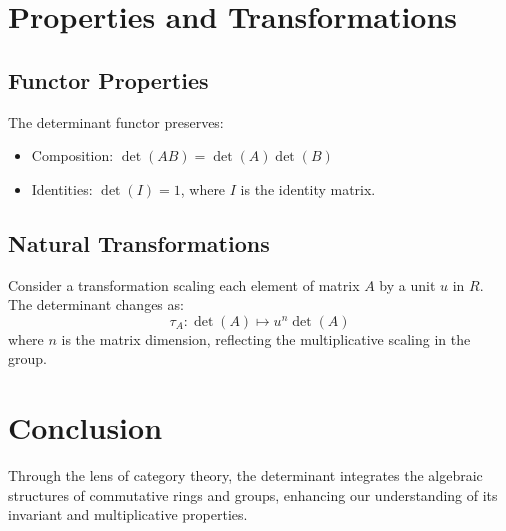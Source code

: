 \section{Properties and Transformations}
\subsection{Functor Properties}
The determinant functor preserves:
\begin{itemize}
	\item Composition: \(\det(AB) = \det(A)\det(B)\)
	\item Identities: \(\det(I) = 1\), where \(I\) is the identity matrix.
\end{itemize}

\subsection{Natural Transformations}
Consider a transformation scaling each element of matrix \(A\) by a unit \(u\) in \(R\). The determinant changes as:
\[ \tau_A: \det(A) \mapsto u^n \det(A) \]
where \(n\) is the matrix dimension, reflecting the multiplicative scaling in the group.

\section{Conclusion}
Through the lens of category theory, the determinant integrates the algebraic structures of commutative rings and groups, enhancing our understanding of its invariant and multiplicative properties.
